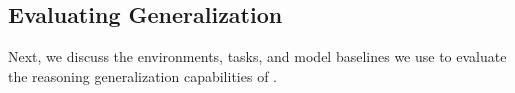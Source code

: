
\subsection{Evaluating Generalization}\label{sec:experiments:evaluation}

Next, we discuss the environments, tasks, and model baselines we use to evaluate the reasoning generalization capabilities of \ACRO.

